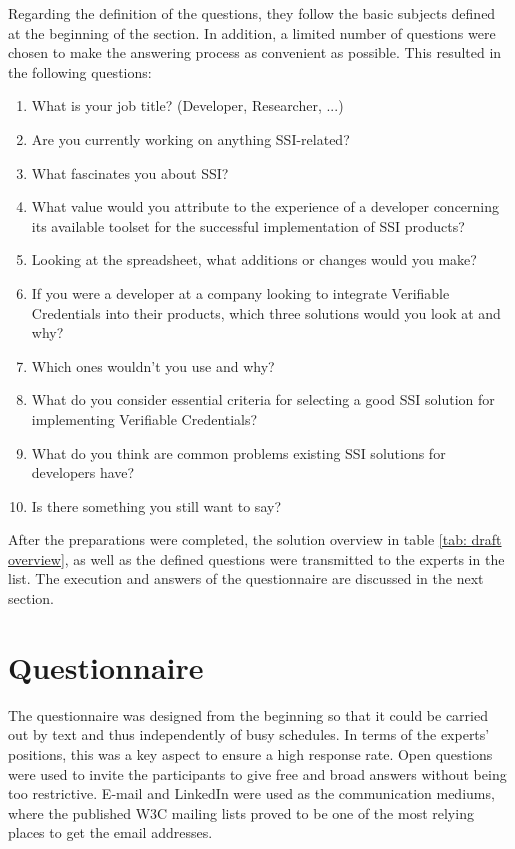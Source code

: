     Regarding the definition of the questions, they follow the basic subjects defined at the beginning of the section. In addition, a limited number of questions were chosen to make the answering process as convenient as possible. This resulted in the following questions:
    
    \begin{enumerate}
        \item What is your job title? (Developer, Researcher, ...)		
        \item Are you currently working on  anything SSI-related?		
        \item What fascinates you about SSI?		
        \item What value would you attribute to the experience of a developer concerning its available toolset for the successful implementation of SSI products?		
        \item Looking at the spreadsheet, what additions or changes would you make?		
        \item If you were a developer at a company looking to integrate Verifiable Credentials into their products, which three solutions would you look at and why?		
        \item Which ones wouldn't you use and why?		
        \item What do you consider essential criteria for selecting a good SSI solution for implementing Verifiable Credentials?		
        \item What do you think are common problems existing SSI solutions for developers have? 
        \item Is there something you still want to say?
    \end{enumerate}

    After the preparations were completed, the solution overview in 
    table \ref{tab: draft overview}, as well as the defined questions were transmitted to the experts in the list. The execution and answers of the questionnaire are discussed in the next section.

	\section{Questionnaire}

	The questionnaire was designed from the beginning so that it could be carried out by text and thus independently of busy schedules. In terms of the experts' positions, this was a key aspect to ensure a high response rate. Open questions were used to invite the participants to give free and broad answers without being too restrictive. E-mail and LinkedIn were used as the communication mediums, where the published \ac{W3C} mailing lists proved to be one of the most relying places to get the email addresses.
	

